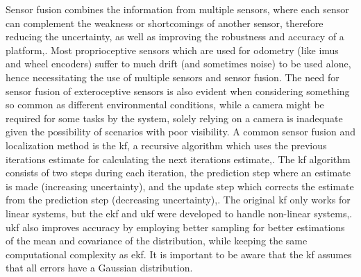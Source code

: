 
Sensor fusion combines the information from multiple sensors, where each sensor can complement the weakness or shortcomings of another sensor, therefore reducing the uncertainty, as well as improving the robustness and accuracy of a platform\:\cite{tian_sensor_2022},\cite{alatise_review_2020}. Most proprioceptive sensors which are used for odometry (like \acp{imu} and wheel encoders) suffer to much drift (and sometimes noise) to be used alone, hence necessitating the use of multiple sensors and sensor fusion\:\cite{alatise_review_2020}. The need for sensor fusion of exteroceptive sensors is also evident when considering something so common as different environmental conditions, while a camera might be required for some tasks by the system, solely relying on a camera is inadequate given the possibility of scenarios with poor visibility\:\cite{alatise_review_2020}.
A common sensor fusion and localization method is the \acf{kf}, a recursive algorithm which uses the previous iterations estimate for calculating the next iterations estimate\:\cite{macenski_desks_2023},\cite{corke_robotics_2023}.
The \ac{kf} algorithm consists of two steps during each iteration, the prediction step where an estimate is made (increasing uncertainty), and the update step which corrects the estimate from the prediction step (decreasing uncertainty)\:\cite{macenski_desks_2023},\cite{corke_robotics_2023}. The original \ac{kf} only works for linear systems, but the \ac{ekf} and \ac{ukf} were developed to handle non-linear systems\:\cite{macenski_desks_2023},\cite{corke_robotics_2023}. 
\ac{ukf} also improves accuracy by employing better sampling for better estimations of the mean and covariance of the distribution, while keeping the same computational complexity as \ac{ekf}\:\cite{wan_unscented_2000}.
It is important to be aware that the \ac{kf} assumes that all errors have a Gaussian distribution\:\cite{corke_robotics_2023}.

